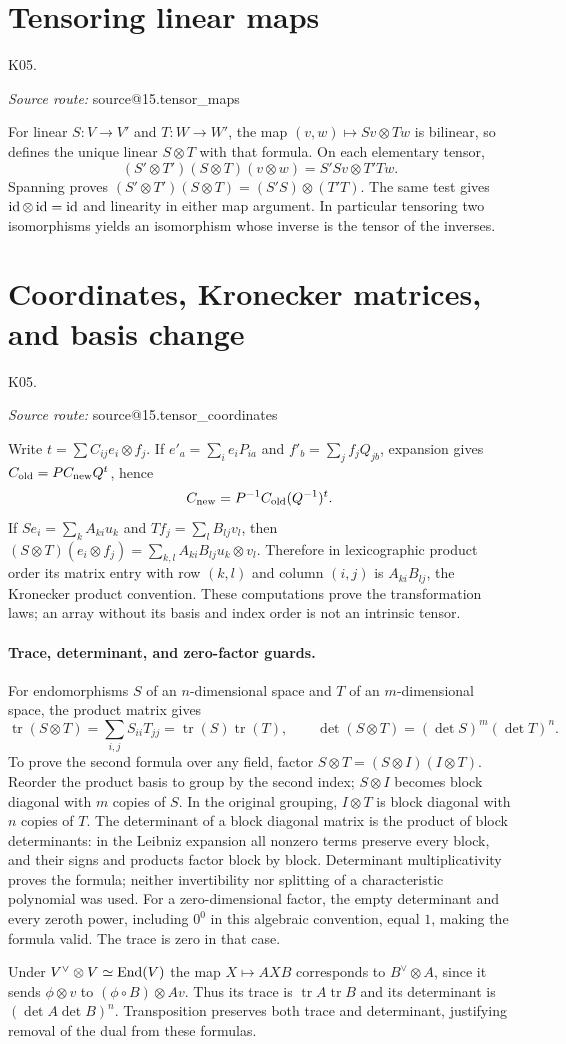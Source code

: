 \documentclass[11pt,a4paper]{book}
\makeatletter
\theoremstyle{definition}\newtheorem{definition}[theorem]{Definition}
\theoremstyle{remark}\newtheorem{remark}[theorem]{Remark}
\DeclareMathOperator{\tr}{tr}\DeclareMathOperator{\Span}{span}
\newcommand{\Kentry}[2]{\section{#2}\label{k:#1}\noindent\textsf{\small K05.\detokenize{#1}}\par
  \begingroup\small\color{black!65}\textit{Source route: }\csname source@#1\endcsname\par\endgroup}
\makeatother
\begin{document}
\Kentry{15.tensor_maps}{Tensoring linear maps}
For linear $S:V\to V'$ and $T:W\to W'$, the map $(v,w)\mapsto Sv\otimes Tw$ is bilinear, so defines the unique linear $S\otimes T$ with that formula. On each elementary tensor,
\[
 (S'\otimes T')(S\otimes T)(v\otimes w)=S'Sv\otimes T'Tw.
\]
Spanning proves $(S'\otimes T')(S\otimes T)=(S'S)\otimes(T'T)$. The same test gives $\operatorname{id}\otimes\operatorname{id}=\operatorname{id}$ and linearity in either map argument. In particular tensoring two isomorphisms yields an isomorphism whose inverse is the tensor of the inverses.

\Kentry{15.tensor_coordinates}{Coordinates, Kronecker matrices, and basis change}
Write $t=\sum C_{ij}e_i\otimes f_j$. If $e'_a=\sum_i e_iP_{ia}$ and $f'_b=\sum_j f_jQ_{jb}$, expansion gives $C_{\rm old}=P C_{\rm new}Q^t$, hence
\[
 C_{\rm new}=P^{-1}C_{\rm old}(Q^{-1})^t.
\]
If $Se_i=\sum_k A_{ki}u_k$ and $Tf_j=\sum_l B_{lj}v_l$, then
$(S\otimes T)(e_i\otimes f_j)=\sum_{k,l}A_{ki}B_{lj}u_k\otimes v_l$. Therefore in lexicographic product order its matrix entry with row $(k,l)$ and column $(i,j)$ is $A_{ki}B_{lj}$, the Kronecker product convention. These computations prove the transformation laws; an array without its basis and index order is not an intrinsic tensor.


\paragraph{Trace, determinant, and zero-factor guards.}
For endomorphisms $S$ of an $n$-dimensional space and $T$ of an $m$-dimensional space, the product matrix gives
\[
 \tr(S\otimes T)=\sum_{i,j}S_{ii}T_{jj}=\tr(S)\tr(T),\qquad
 \det(S\otimes T)=(\det S)^m(\det T)^n.
\]
To prove the second formula over any field, factor $S\otimes T=(S\otimes I)(I\otimes T)$. Reorder the product basis to group by the second index; $S\otimes I$ becomes block diagonal with $m$ copies of $S$. In the original grouping, $I\otimes T$ is block diagonal with $n$ copies of $T$. The determinant of a block diagonal matrix is the product of block determinants: in the Leibniz expansion all nonzero terms preserve every block, and their signs and products factor block by block. Determinant multiplicativity proves the formula; neither invertibility nor splitting of a characteristic polynomial was used. For a zero-dimensional factor, the empty determinant and every zeroth power, including $0^0$ in this algebraic convention, equal $1$, making the formula valid. The trace is zero in that case.

Under $V^\vee\otimes V\simeq\operatorname{End}(V)$ the map $X\mapsto AXB$ corresponds to $B^\vee\otimes A$, since it sends $\phi\otimes v$ to $(\phi\circ B)\otimes Av$. Thus its trace is $\tr A\tr B$ and its determinant is $(\det A\det B)^n$. Transposition preserves both trace and determinant, justifying removal of the dual from these formulas.
\end{document}
